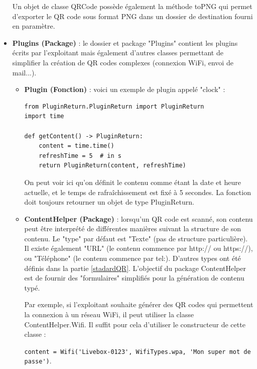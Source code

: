 \documentclass[a4paper,12pt]{article}
\begin{document}
\begin{itemize}
    Un objet de classe QRCode possède également la méthode toPNG qui permet d'exporter le QR code sous format PNG dans un dossier de destination fourni en paramètre.
    \\
 
 \item \textbf{Plugins (Package)} : le dossier et package "Plugins" contient les plugins écrits par l'exploitant mais également d'autres classes permettant de simplifier la création de QR codes complexes (connexion WiFi, envoi de mail...).
 
    \begin{itemize}
        \item \textbf{Plugin (Fonction)} : voici un exemple de plugin appelé "clock" :\\
    
        \begin{lstlisting}
from PluginReturn.PluginReturn import PluginReturn
import time

def getContent() -> PluginReturn:
    content = time.time()
    refreshTime = 5  # in s
    return PluginReturn(content, refreshTime)
        \end{lstlisting}
        
        On peut voir ici qu'on définit le contenu comme étant la date et heure actuelle, et le temps de rafraîchissement est fixé à 5 secondes. La fonction doit toujours retourner un objet de type PluginReturn.\\
    
        \item \textbf{ContentHelper (Package)} : lorsqu'un QR code est scanné, son contenu peut être interprété de différentes manières suivant la structure de son contenu. Le "type" par défaut est "Texte" (pas de structure particulière). Il existe également "URL" (le contenu commence par http:// ou https://), ou "Téléphone" (le contenu commence par tel:). D'autres types ont été définis dans la partie \ref{stadardQR}. L'objectif du package ContentHelper est de fournir des "formulaires" simplifiés pour la génération de contenu typé.
        
        Par exemple, si l'exploitant souhaite générer des QR codes qui permettent la connexion à un réseau WiFi, il peut utiliser la classe ContentHelper.Wifi.
        Il suffit pour cela d'utiliser le constructeur de cette classe : 
        
        \verb|content = Wifi('Livebox-0123', WifiTypes.wpa, 'Mon super mot de passe')|.
        

\end{itemize}
\end{itemize}
\end{document}
